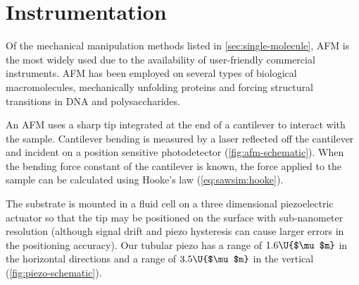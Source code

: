 \section{Instrumentation}
\label{sec:afm}

Of the mechanical manipulation methods listed in
\cref{sec:single-molecule}, AFM is the most widely used due to the
availability of user-friendly commercial instruments.  AFM has been
employed on several types of biological macromolecules, mechanically
unfolding proteins\citep{carrion-vazquez99a} and forcing structural
transitions in DNA\citep{florin95,rief99} and
polysaccharides\citep{rief97a}.

An AFM uses a sharp tip integrated at the end of a
cantilever to interact with the sample\citep{binnig86}.  Cantilever
bending is measured by a laser reflected off the cantilever and
incident on a position sensitive photodetector\citep{meyer88}
(\cref{fig:afm-schematic}).  When the bending force constant of the
cantilever is known\citep{levy02}, the force applied to the sample can
be calculated using Hooke's law (\cref{eq:sawsim:hooke}).

The substrate is mounted in a fluid cell\citep{drake89,radmacher92} on
a three dimensional piezoelectric actuator so that the tip may be
positioned on the surface with sub-nanometer resolution (although
signal drift and piezo hysteresis can cause larger errors in the
positioning accuracy).  Our tubular piezo has a range of
$1.6\U{$\mu$m}$ in the horizontal directions and a range of
$3.5\U{$\mu$m}$ in the vertical (\cref{fig:piezo-schematic}).

